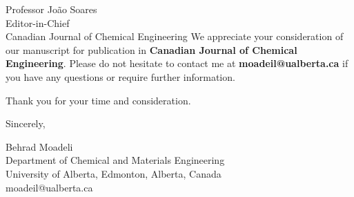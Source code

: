 \documentclass[11pt]{letter}
\begin{document}
\begin{letter}{Professor João Soares \\
Editor-in-Chief \\
Canadian Journal of Chemical Engineering}
We appreciate your consideration of our manuscript for publication in \textbf{Canadian Journal of Chemical Engineering}. Please do not hesitate to contact me at \textbf{moadeil@ualberta.ca} if you have any questions or require further information.

Thank you for your time and consideration.

\closing{Sincerely,}

\vspace{-4em} %

Behrad Moadeli \\
Department of Chemical and Materials Engineering \\
University of Alberta, Edmonton, Alberta, Canada \\
moadeil@ualberta.ca

\end{letter}
\end{document}
